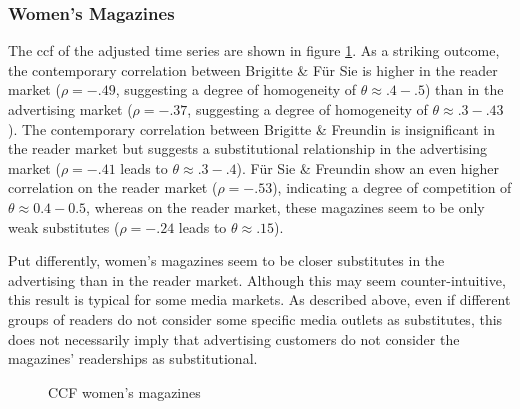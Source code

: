 \documentclass[12pt,a4paper,notitlepage]{article}
\begin{document}
\subsubsection{Women's Magazines}

The ccf of the adjusted time series are shown in figure \ref{fig_ccf_women}. As a striking outcome, the contemporary correlation between Brigitte \& Für Sie is higher in the reader market ($\rho=-.49$, suggesting a degree of homogeneity of $\theta\approx.4-.5$) than in the advertising market ($\rho=-.37$, suggesting a degree of homogeneity of $\theta\approx.3-.43$). The contemporary correlation between Brigitte \& Freundin is insignificant in the reader market but suggests a substitutional relationship in the advertising market ($\rho=-.41$ leads to $\theta\approx.3-.4$). Für Sie \& Freundin show an even higher correlation on the reader market ($\rho=-.53$), indicating a degree of competition of $\theta\approx0.4-0.5$, whereas on the reader market, these magazines seem to be only weak substitutes ($\rho=-.24$ leads to $\theta \approx .15$).

Put differently, women's magazines seem to be closer substitutes in the advertising than in the reader market. Although this may seem counter-intuitive, this result is typical for some media markets. As described above, even if different groups of readers do not consider some specific media outlets as substitutes, this does not necessarily imply that advertising customers do not consider the magazines' readerships as substitutional. 

\begin{figure}[H]\centering
\caption{CCF women's magazines}
	\label{fig_ccf_women}
\end{figure}
\end{document}
